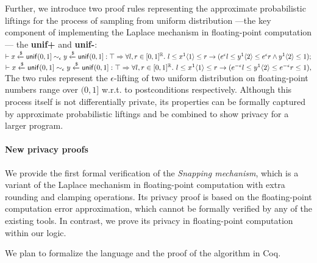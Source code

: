 \documentclass[a4paper,11pt]{article}
\begin{document}
Further, we introduce two proof rules representing the approximate probabilistic liftings for the process of sampling from uniform distribution 
---the key component of implementing the Laplace mechanism in floating-point computation---
the \textbf{unif+} and \textbf{unif-}:
\\
$\vdash
	x \xleftarrow{\$} \mathsf{unif}(0, 1] 	
	\sim_{\epsilon} 
	y \xleftarrow{\$} \mathsf{unif}(0, 1]
	:
	\top
	\Rightarrow
	\forall l, r \in [0,1]^{\mathbb{R}}. ~
	l \leq x^1 \langle 1 \rangle \leq r 
	\rightarrow
	(e^{\epsilon} l \leq y^1 \langle 2 \rangle \leq e^{\epsilon}r \land y^1 \langle 2 \rangle\leq 1);	
$
\\
$\vdash
	x \xleftarrow{\$} \mathsf{unif}(0, 1] 	
	\sim_{\epsilon} 
	y \xleftarrow{\$} \mathsf{unif}(0, 1]
	:
	\top
	\Rightarrow
	\forall l, r \in [0,1]^{\mathbb{R}}. ~
	l \leq x^1 \langle 1 \rangle \leq r 
	\rightarrow
	(e^{-\epsilon} l \leq y^1 \langle 2 \rangle \leq e^{-\epsilon}r \leq 1),
$
\\
The two rules represent the $\epsilon$-lifting of two uniform distribution on floating-point numbers range over $(0, 1]$ w.r.t. to postconditions respectively.
%
%
%
Although this process itself is not differentially private, its properties can be formally captured by approximate probabilistic liftings and be combined to show privacy for a larger program.
%
\paragraph{New privacy proofs}
We provide the first formal verification of the \emph{Snapping mechanism}, which is a variant of the Laplace mechanism in floating-point computation with extra rounding and clamping operations. 
Its privacy proof is based on the floating-point computation error approximation, which cannot be formally verified by any of the existing tools. 
In contrast, we prove its privacy in floating-point computation within our logic.

We plan to formalize the language and the proof of the algorithm in Coq.
\end{document}
